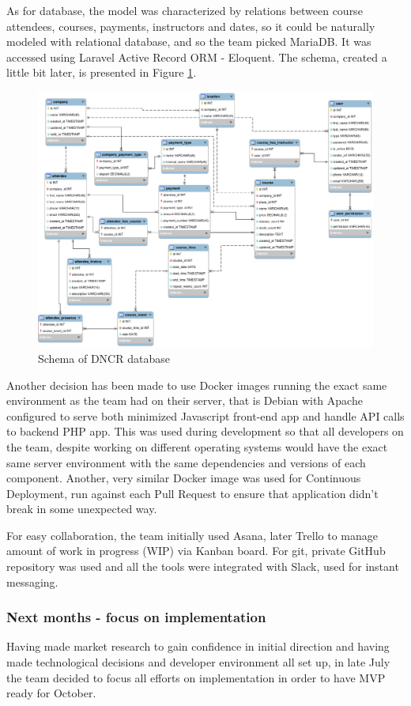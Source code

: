 \documentclass{article}
\begin{document}
As for database, the model was characterized by relations between course attendees, courses, payments, instructors and dates, so it could be naturally modeled with relational database, and so the team picked MariaDB. It was accessed using Laravel Active Record ORM - Eloquent. The schema, created a little bit later, is presented in Figure \ref{fig:schema}.

\begin{figure}[h]
    \includegraphics[width=\textwidth]{schema}
    \caption{Schema of DNCR database}
    \label{fig:schema}
\end{figure}

Another decision has been made to use Docker images running the exact same environment as the team had on their server, that is Debian with Apache configured to serve both minimized Javascript front-end app and handle API calls to backend PHP app. This was used during development so that all developers on the team, despite working on different operating systems would have the exact same server environment with the same dependencies and versions of each component. Another, very similar Docker image was used for Continuous Deployment, run against each Pull Request to ensure that application didn't break in some unexpected way.

For easy collaboration, the team initially used Asana, later Trello to manage amount of work in progress (WIP) via Kanban board. For git, private GitHub repository was used and all the tools were integrated with Slack, used for instant messaging. 

\subsubsection{Next months - focus on implementation}
Having made market research to gain confidence in initial direction and having made technological decisions and developer environment all set up, in late July the team decided to focus all efforts on implementation in order to have MVP ready for October.
\end{document}

